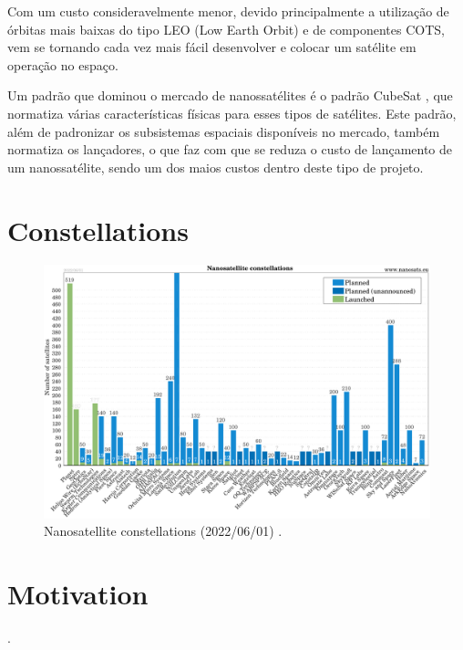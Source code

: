 Com um custo consideravelmente menor, devido principalmente a utilização de órbitas mais baixas do tipo LEO (Low Earth Orbit) e de componentes COTS, vem se tornando cada vez mais fácil desenvolver e colocar um satélite em operação no espaço.

Um padrão que dominou o mercado de nanossatélites é o padrão CubeSat \cite{cds}, que normatiza várias características físicas para esses tipos de satélites. Este padrão, além de padronizar os subsistemas espaciais disponíveis no mercado, também normatiza os lançadores, o que faz com que se reduza o custo de lançamento de um nanossatélite, sendo um dos maios custos dentro deste tipo de projeto.

\section{Constellations}

\begin{figure}[!ht]
    \begin{center}
        \includegraphics[width=\columnwidth]{figures/Nanosats_constellations_2022-06-01}
        \caption{Nanosatellite constellations (2022/06/01) \cite{nanosatseu}.}
        \label{fig:constellations}
    \end{center}
\end{figure}

\section{Motivation}

.
